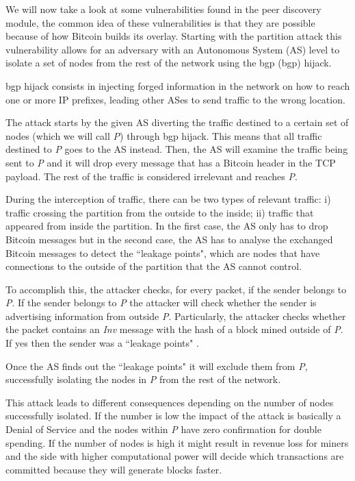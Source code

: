 \label{sec:partition}
We will now take a look at some vulnerabilities found in the peer discovery module, the common idea of these vulnerabilities is that they are possible because of how Bitcoin builds its overlay. Starting with the partition attack this vulnerability allows for an adversary with an Autonomous System (AS) level to isolate a set of nodes from the rest of the network using the \acrlong{bgp} (\acrshort{bgp}) hijack.

\acrshort{bgp} hijack consists in injecting forged information in the network on how to reach one or more IP prefixes, leading other ASes to send traffic to the wrong location.

The attack starts by the given AS diverting the traffic destined to a certain set of nodes (which we will call \textit{P}) through \acrshort{bgp} hijack. This means that all traffic destined to \textit{P} goes to the AS instead. Then, the AS will examine the traffic being sent to \textit{P} and it will drop every message that has a Bitcoin header in the TCP payload. The rest of the traffic is considered irrelevant and reaches \textit{P}.

During the interception of traffic, there can be two types of relevant traffic: i) traffic crossing the partition from the outside to the inside; ii) traffic that appeared from inside the partition. In the first case, the AS only has to drop Bitcoin messages but in the second case, the AS has to analyse the exchanged Bitcoin messages to detect the ``leakage points", which are nodes that have connections to the outside of the partition that the AS cannot control.

To accomplish this, the attacker checks, for every packet, if the sender belongs to \textit{P}. If the sender belongs to \textit{P} the attacker will check whether the sender is advertising information from outside \textit{P}. Particularly, the attacker checks whether the packet contains an \textit{Inv} message with the hash of a block mined outside of \textit{P}. If yes then the sender was a ``leakage points"  \cite{apostolaki2016hijacking}.

Once the AS finds out the ``leakage points" it will exclude them from \textit{P}, successfully isolating the nodes in \textit{P} from the rest of the network.

This attack leads to different consequences depending on the number of nodes successfully isolated. If the number is low the impact of the attack is basically a Denial of Service and the nodes within \textit{P} have zero confirmation for double spending. If the number of nodes is high it might result in revenue loss for miners and the side with higher computational power will decide which transactions are committed because they will generate blocks faster.

